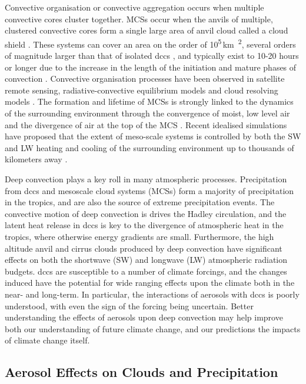 Convective organisation or convective aggregation occurs when multiple convective cores cluster together. MCSs occur when the anvils of multiple, clustered convective cores form a single large area of anvil cloud called a cloud shield \citep{roca_simple_2017}. 
These systems can cover an area on the order of 10\textsuperscript{5}\,\unit{km\textsuperscript{2}}, several orders of magnitude larger than that of isolated \acrshort{dcc}s \citep{houze_mesoscale_2004}, and typically exist to 10-20 hours or longer \citep{chen_diurnal_1997} due to the increase in the length of the initiation and mature phases of convection \citep{wall_life_2018}.
Convective organisation processes have been observed in satellite remote sensing, radiative-convective equilibrium models and cloud resolving models \citep{holloway_observing_2017}. 
The formation and lifetime of MCSs is strongly linked to the dynamics of the surrounding environment through the convergence of moist, low level air and the divergence of air at the top of the MCS \citep{houze_chapter_2014}. 
Recent idealised simulations have proposed that the extent of meso-scale systems is controlled by both the SW and LW heating and cooling of the surrounding environment up to thousands of kilometers away \citep{beucler_budget_2019}. 


Deep convection plays a key roll in many atmospheric processes.
Precipitation from \acrshort{dcc}s and mesoscale cloud systems (MCSs) form a majority of precipitation in the tropics, and are also the source of extreme precipitation events.
The convective motion of deep convection is drives the Hadley circulation, and the latent heat release in \acrshort{dcc}s is key to the divergence of atmospheric heat in the tropics, where otherwise energy gradients are small.
Furthermore, the high altitude anvil and cirrus clouds produced by deep convection have significant effects on both the shortwave (SW) and longwave (LW) atmospheric radiation budgets.
\acrshort{dcc}s are susceptible to a number of climate forcings, and the changes induced have the potential for wide ranging effects upon the climate both in the near- and long-term.
In particular, the interactions of aerosols with \acrshort{dcc}s is poorly understood, with even the sign of the forcing being uncertain. Better understanding the effects of aerosols upon deep convection may help improve both our understanding of future climate change, and our predictions the impacts of climate change itself.

\subsection{Aerosol Effects on Clouds and Precipitation}


